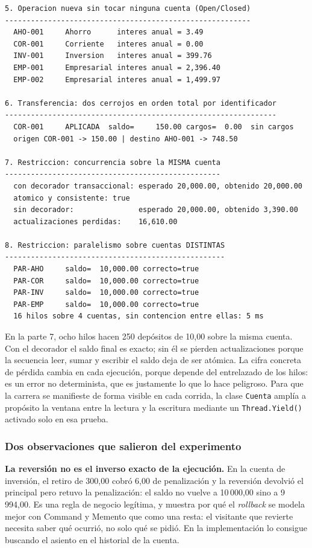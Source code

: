 {\begin{verbatim}
5. Operacion nueva sin tocar ninguna cuenta (Open/Closed)
---------------------------------------------------------
  AHO-001     Ahorro      interes anual = 3.49
  COR-001     Corriente   interes anual = 0.00
  INV-001     Inversion   interes anual = 399.76
  EMP-001     Empresarial interes anual = 2,396.40
  EMP-002     Empresarial interes anual = 1,499.97

6. Transferencia: dos cerrojos en orden total por identificador
---------------------------------------------------------------
  COR-001     APLICADA  saldo=     150.00 cargos=  0.00  sin cargos
  origen COR-001 -> 150.00 | destino AHO-001 -> 748.50

7. Restriccion: concurrencia sobre la MISMA cuenta
--------------------------------------------------
  con decorador transaccional: esperado 20,000.00, obtenido 20,000.00
  atomico y consistente: true
  sin decorador:               esperado 20,000.00, obtenido 3,390.00
  actualizaciones perdidas:    16,610.00

8. Restriccion: paralelismo sobre cuentas DISTINTAS
---------------------------------------------------
  PAR-AHO     saldo=  10,000.00 correcto=true
  PAR-COR     saldo=  10,000.00 correcto=true
  PAR-INV     saldo=  10,000.00 correcto=true
  PAR-EMP     saldo=  10,000.00 correcto=true
  16 hilos sobre 4 cuentas, sin contencion entre ellas: 5 ms
\end{verbatim}
}

En la parte 7, ocho hilos hacen 250 depósitos de 10,00 sobre la misma cuenta. Con el decorador
el saldo final es exacto; sin él se pierden actualizaciones porque la secuencia leer, sumar y
escribir el saldo deja de ser atómica. La cifra concreta de pérdida cambia en cada ejecución,
porque depende del entrelazado de los hilos: es un error no determinista, que es justamente lo
que lo hace peligroso. Para que la carrera se manifieste de forma visible en cada corrida, la
clase \texttt{Cuenta} amplía a propósito la ventana entre la lectura y la escritura mediante un
\texttt{Thread.Yield()} activado solo en esa prueba.

\subsubsection*{Dos observaciones que salieron del experimento}

\textbf{La reversión no es el inverso exacto de la ejecución.} En la cuenta de inversión, el
retiro de 300,00 cobró 6,00 de penalización y la reversión devolvió el principal pero retuvo
la penalización: el saldo no vuelve a 10\,000,00 sino a 9\,994,00. Es una regla de negocio
legítima, y muestra por qué el \textit{rollback} se modela mejor con Command y Memento que
como una resta: el visitante que revierte necesita saber qué ocurrió, no solo qué se pidió. En
la implementación lo consigue buscando el asiento en el historial de la cuenta.


